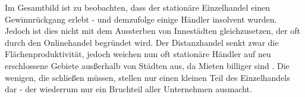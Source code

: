 Im Gesamtbild ist zu beobachten, dass der stationäre Einzelhandel einen Gewinnrückgang erlebt - und demzufolge einige Händler insolvent wurden. Jedoch ist dies nicht mit dem Aussterben von Innestädten gleichzusetzen, der oft durch den Onlinehandel begründet wird. Der Distanzhandel senkt zwar die Flächenproduktivität, jedoch weichen nun oft stationäre Händler auf neu erschlossene Gebiete ausßerhalb von Städten aus, da Mieten billiger sind \cite[S. 30]{evilcom}. Die wenigen, die schließen müssen, stellen nur einen kleinen Teil des Einzelhandels dar - der wiederrum nur ein Bruchteil aller Unternehmen ausmacht.


